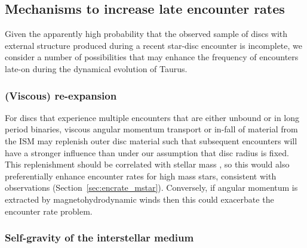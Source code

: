 \documentclass{aa}
\begin{document}


\subsection{Mechanisms to increase late encounter rates}
\label{sec:add_physics}
Given the apparently high probability that the observed sample of discs with external structure produced during a recent star-disc encounter is incomplete, we consider a number of possibilities that may enhance the frequency of encounters late-on during the dynamical evolution of Taurus. 

\subsubsection{(Viscous) re-expansion}
\label{sec:visc_exp}
For discs that experience multiple encounters that are either unbound or in long period binaries, viscous angular momentum transport \citep[e.g.][]{Lyn74} or in-fall of material from the ISM \citep[e.g.][]{Padoan05, Manara18, Kuffmeier23, Gupta23, Padoan24, Winter24} may replenish outer disc material such that subsequent encounters will have a stronger influence than under our assumption that disc radius is fixed. This replenishment should be correlated with stellar mass \citep[as suggested by observed stellar accretion rates --][]{Manara17}, so this would also preferentially enhance encounter rates for high mass stars, consistent with observations (Section~\ref{sec:encrate_mstar}). Conversely, if angular momentum is extracted by magnetohydrodynamic winds \citep[e.g.][]{Bai13} then this could exacerbate the encounter rate problem.  

\subsubsection{Self-gravity of the interstellar medium}
\label{sec:selfgrav}
\end{document}

